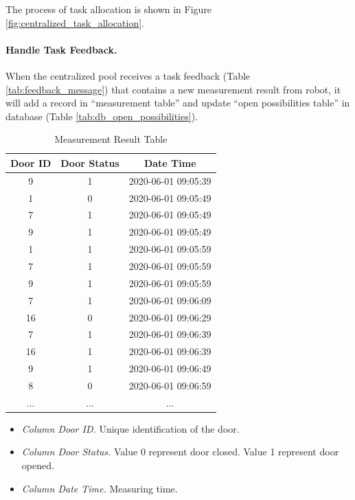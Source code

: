 The process of task allocation is shown in Figure \ref{fig:centralized_task_allocation}. 

\paragraph{Handle Task Feedback.}
When the centralized pool receives a task feedback (Table \ref{tab:feedback_message}) that contains a new measurement result from robot, it will add a record in ``measurement table'' and update ``open possibilities table'' in database (Table \ref{tab:db_open_possibilities}).

\begin{table}[htb]
\centering
\begin{tabular}{|c| c| c|} 
\hline
Door ID & Door Status & Date Time \\
\hline
9 & 1 & 2020-06-01 09:05:39 \\ \hline
1 & 0 & 2020-06-01 09:05:49 \\ \hline
7 & 1 & 2020-06-01 09:05:49 \\ \hline
9 & 1 & 2020-06-01 09:05:49 \\ \hline
1 & 1 & 2020-06-01 09:05:59 \\ \hline
7 & 1 & 2020-06-01 09:05:59 \\ \hline
9 & 1 & 2020-06-01 09:05:59 \\ \hline
7 & 1 & 2020-06-01 09:06:09 \\ \hline
16 & 0 & 2020-06-01 09:06:29 \\ \hline
7 & 1 & 2020-06-01 09:06:39 \\ \hline
16 & 1 & 2020-06-01 09:06:39 \\ \hline
9 & 1 & 2020-06-01 09:06:49 \\ \hline
8 & 0 & 2020-06-01 09:06:59 \\ \hline
... & ...& ... \\ \hline
\end{tabular}
\caption{Measurement Result Table}
\label{tab:db_measurement_result}
\begin{itemize}
    \item \textsl{Column Door ID.} Unique identification of the door.
    \item \textsl{Column Door Status.} Value 0 represent door closed. Value 1 represent door opened.
    \item \textsl{Column Date Time.} Measuring time.
\end{itemize}

\end{table}

